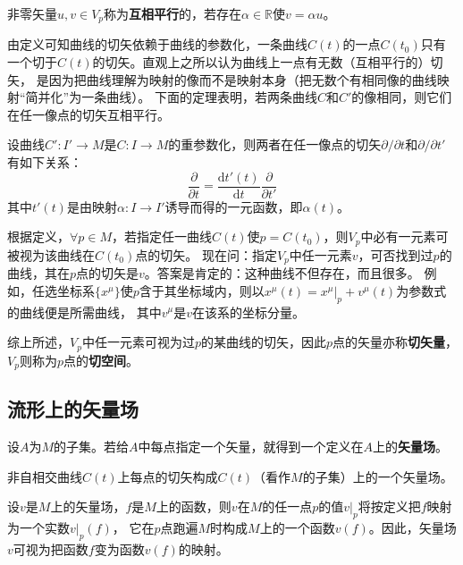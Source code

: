 \begin{definition}
非零矢量$u, v \in V_p$称为\textbf{互相平行}的，若存在$\alpha \in \mathbb{R}$使$v = \alpha u$。
\end{definition}

由定义可知曲线的切矢依赖于曲线的参数化，一条曲线$C(t)$的一点$C(t_0)$只有一个切于$C(t)$的切矢。直观上之所以认为曲线上一点有无数（互相平行的）切矢，
是因为把曲线理解为映射的像而不是映射本身（把无数个有相同像的曲线映射``简并化''为一条曲线）。
下面的定理表明，若两条曲线$C$和$C'$的像相同，则它们在任一像点的切矢互相平行。

\begin{theorem}
设曲线$C' \colon I' \to M$是$C \colon I \to M$的重参数化，则两者在任一像点的切矢$\partial / \partial t$和$\partial / \partial t'$有如下关系：
$$\frac{\partial}{\partial t} = \frac{\mathrm{d}t'(t)}{\mathrm{d}t}\frac{\partial}{\partial t'}$$
其中$t'(t)$是由映射$\alpha \colon I \to I'$诱导而得的一元函数，即$\alpha(t)$。
\end{theorem}

根据定义，$\forall p \in M$，若指定任一曲线$C(t)$使$p = C(t_0)$，则$V_p$中必有一元素可被视为该曲线在$C(t_0)$点的切矢。
现在问：指定$V_p$中任一元素$v$，可否找到过$p$的曲线，其在$p$点的切矢是$v$。答案是肯定的：这种曲线不但存在，而且很多。
例如，任选坐标系$\{x^\mu\}$使$p$含于其坐标域内，则以$x^\mu(t) = x^\mu|_p + v^\mu(t)$为参数式的曲线便是所需曲线，
其中$v^\mu$是$v$在该系的坐标分量。

综上所述，$V_p$中任一元素可视为过$p$的某曲线的切矢，因此$p$点的矢量亦称\textbf{切矢量}，$V_p$则称为$p$点的\textbf{切空间}。

\subsection{流形上的矢量场}

\begin{definition}
设$A$为$M$的子集。若给$A$中每点指定一个矢量，就得到一个定义在$A$上的\textbf{矢量场}。
\end{definition}

\begin{example}
非自相交曲线$C(t)$上每点的切矢构成$C(t)$（看作$M$的子集）上的一个矢量场。
\end{example}

设$v$是$M$上的矢量场，$f$是$M$上的函数，则$v$在$M$的任一点$p$的值$v|_p$将按定义把$f$映射为一个实数$v|_p(f)$，
它在$p$点跑遍$M$时构成$M$上的一个函数$v(f)$。因此，矢量场$v$可视为把函数$f$变为函数$v(f)$的映射。


